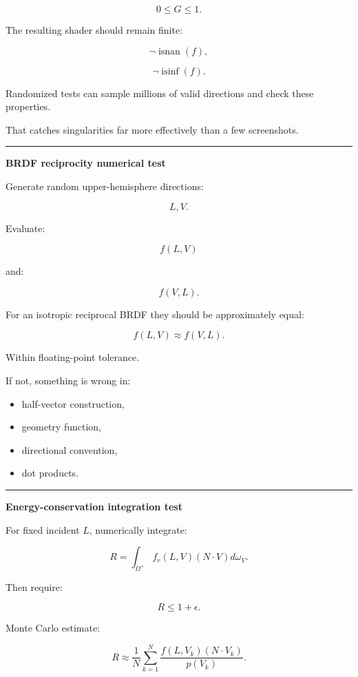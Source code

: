 \[
0\le G\le1.
\]

The resulting shader should remain finite:

\[
\neg\operatorname{isnan}(f),
\]

\[
\neg\operatorname{isinf}(f).
\]

Randomized tests can sample millions of valid directions and check these properties.

That catches singularities far more effectively than a few screenshots.

\begin{center}\rule{0.5\linewidth}{0.5pt}\end{center}

\textbf{BRDF reciprocity numerical test}

Generate random upper-hemisphere directions:

\[
L,V.
\]

Evaluate:

\[
f(L,V)
\]

and:

\[
f(V,L).
\]

For an isotropic reciprocal BRDF they should be approximately equal:

\[
\boxed{
f(L,V)
\approx
f(V,L).
}
\]

Within floating-point tolerance.

If not, something is wrong in:

\begin{itemize}
\tightlist
\item
  half-vector construction,
\item
  geometry function,
\item
  directional convention,
\item
  dot products.
\end{itemize}

\begin{center}\rule{0.5\linewidth}{0.5pt}\end{center}

\textbf{Energy-conservation integration test}

For fixed incident \(L\), numerically integrate:

\[
R=
\int_{\Omega^+}
f_r(L,V)
(N\cdot V)
d\omega_V.
\]

Then require:

\[
R\le1+\epsilon.
\]

Monte Carlo estimate:

\[
R
\approx
\frac1N
\sum_{k=1}^N
\frac{
f(L,V_k)
(N\cdot V_k)
}{
p(V_k)
}.
\]

